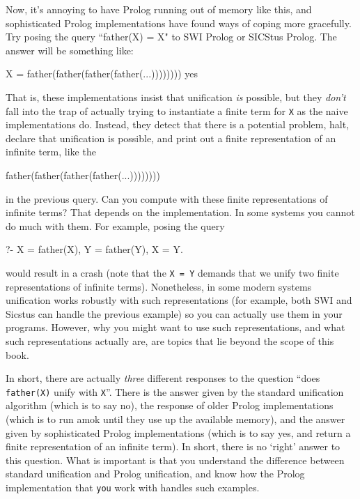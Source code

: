 Now, it's annoying to have Prolog running out of memory like this, and
sophisticated Prolog implementations have found  ways of coping more
gracefully. Try posing the query ``father(X) = X" to SWI Prolog or
SICStus Prolog. The answer will be something like:
\begin{LPNcodedisplay}
X = father(father(father(father(...))))))))
yes
\end{LPNcodedisplay}
%
That is, these implementations insist that unification \textit{is}
possible, but they \textit{don't} fall into the trap of actually
trying to instantiate a finite term for \texttt{X} as the naive
implementations do. Instead, they detect that there is a potential
problem, halt, declare that unification is possible, and print out a
finite representation of an infinite term, like the
\begin{LPNcodedisplay}
father(father(father(father(...))))))))
\end{LPNcodedisplay}
in the previous query.  Can you compute with these finite
representations of infinite terms?  That depends on the
implementation.  In some systems you cannot do much with them. For
example, posing the query
\begin{LPNcodedisplay}
?- X = father(X), Y = father(Y), X = Y.
\end{LPNcodedisplay}
would result in a crash (note that the \texttt{X = Y} demands that we
unify two finite representations of infinite terms). Nonetheless, in some
modern systems unification works robustly with such representations
(for example, both SWI and Sicstus can handle the previous example) so you can
actually use them in your programs. However, why you might want to use
such representations, and what such representations actually are, are
topics that lie beyond the scope of this book.


In short, there are actually \textit{three} different responses to the
question ``does \texttt{father(X)} unify with \texttt{X}''. There is
the answer given by the standard unification algorithm (which is to
say no), the response of older Prolog implementations (which is to run
amok until they use up the available memory), and the answer given by
sophisticated Prolog implementations (which is to say yes, and return
a finite representation of an infinite term). In short, there is no
`right' answer to this question. What is important is that you
understand the difference between standard unification and Prolog
unification, and know how the Prolog implementation that \texttt{you}
work with handles such examples.

